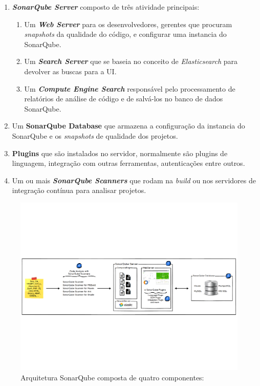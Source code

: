 \begin{enumerate}
\item \textbf{\textit{SonarQube Server}} composto de três atividade principais:
	\begin{enumerate}
	\item Um \textbf{\textit{Web Server}} para os desenvolvedores, gerentes que procuram \textit{snapshots} da qualidade do código, e configurar uma instancia do SonarQube.
	\item Um \textbf{\textit{Search Server}} que se baseia no conceito de \textit{Elasticsearch} para devolver as buscas para a UI.
	\item Um \textbf{\textit{Compute Engine Search}} responsável pelo processamento de relatórios de análise de código e  de salvá-los no banco de dados SonarQube.
	\end{enumerate}
\item Um \textbf{SonarQube Database} que armazena a configuração da instancia do SonarQube e os \textit{snapshots} de qualidade dos projetos.
\item \textbf{Plugins} que são instalados no servidor, normalmente são plugins de linguagem, integração com outras ferramentas, autenticações entre outros.
\item Um ou mais \textbf{\textit{SonarQube Scanners}} que rodam na \textit{build} ou nos servidores de integração contínua para analisar projetos.
\end{enumerate}
\graphicspath{{figuras/}}
\begin{figure}[h]
\centering
\includegraphics[scale=0.5]{Arq_Sonar}
\caption{Arquitetura SonarQube composta de quatro componentes: \cite{sonar}}
\label{img:arq_sonar}
\end{figure}

